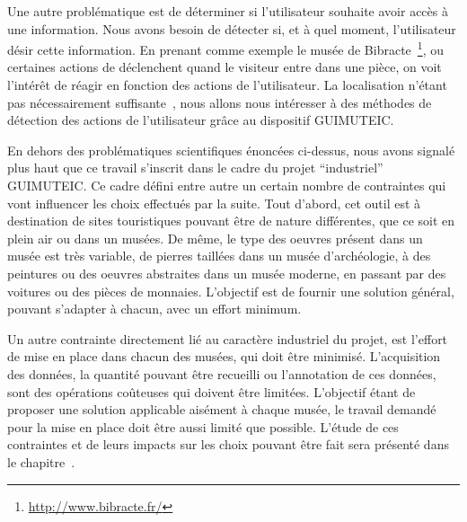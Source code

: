 Une autre problématique est de déterminer si l'utilisateur souhaite avoir accès à une information. 
Nous avons besoin de détecter si, et à quel moment, l'utilisateur désir cette information.
En prenant comme exemple le musée de Bibracte~\footnote{\url{http://www.bibracte.fr/}}, ou certaines actions de déclenchent quand le visiteur entre dans une pièce, on voit l'intérêt de réagir en fonction des actions de l'utilisateur.
La localisation n'étant pas nécessairement suffisante~\cite{Locationisnotenough}, nous allons nous intéresser à des méthodes de détection des actions de l'utilisateur grâce au dispositif GUIMUTEIC.
 
 


En dehors des problématiques scientifiques énoncées ci-dessus, nous avons signalé plus haut que ce travail s'inscrit dans le cadre du projet ``industriel'' GUIMUTEIC.
Ce cadre défini entre autre un certain nombre de contraintes qui vont influencer les choix effectués par la suite. 
Tout d'abord, cet outil est à destination de sites touristiques pouvant être de nature différentes, que ce soit en plein air ou dans un musées. 
De même, le type des oeuvres présent dans un musée est très variable, de pierres taillées dans un musée d'archéologie, à des peintures ou des oeuvres abstraites dans un musée moderne, en passant par des voitures ou des pièces de monnaies.
L'objectif est de fournir une solution général, pouvant s'adapter à chacun, avec un effort minimum.

Un autre contrainte directement lié au caractère industriel du projet, est l'effort de mise en place dans chacun des musées, qui doit être minimisé. 
L'acquisition des données, la quantité pouvant être recueilli ou l'annotation de ces données, sont des opérations coûteuses qui doivent être limitées. 
L'objectif étant de proposer une solution applicable aisément à chaque musée, le travail demandé pour la mise en place doit être aussi limité que possible.
L'étude de ces contraintes et de leurs impacts sur les choix pouvant être fait sera présenté dans le chapitre~.





